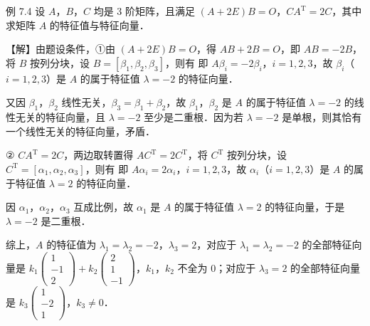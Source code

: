 \begin{fcard}{例 7.4}
设 $A$，$B$，$C$ 均是 3 阶矩阵，且满足 $(A+2E)B=O$，$CA^{\mathrm{T}}=2C$，其中
求矩阵 $A$ 的特征值与特征向量．

【解】由题设条件，①由 $(A+2E)B=O$，得 $AB+2B=O$，即 $AB=-2B$，将 $B$ 按列分块，设 $B=[\beta_1,\beta_2,\beta_3]$，则有
即 $A\beta_i=-2\beta_i$，$i=1,2,3$，故 $\beta_i$（$i=1,2,3$）是 $A$ 的属于特征值 $\lambda=-2$ 的特征向量．


又因 $\beta_1$，$\beta_2$ 线性无关，$\beta_3=\beta_1+\beta_2$，故 $\beta_1$，$\beta_2$ 是 $A$ 的属于特征值 $\lambda=-2$ 的线性无关的特征向量，且 $\lambda=-2$ 至少是二重根．因为若 $\lambda=-2$ 是单根，则其恰有一个线性无关的特征向量，矛盾．

② $CA^{\mathrm{T}}=2C$，两边取转置得 $AC^{\mathrm{T}}=2C^{\mathrm{T}}$，将 $C^{\mathrm{T}}$ 按列分块，设 $C^{\mathrm{T}}=[\alpha_1,\alpha_2,\alpha_3]$，则有
即 $A\alpha_i=2\alpha_i$，$i=1,2,3$，故 $\alpha_i$（$i=1,2,3$）是 $A$ 的属于特征值 $\lambda=2$ 的特征向量．

因 $\alpha_1$，$\alpha_2$，$\alpha_3$ 互成比例，故 $\alpha_1$ 是 $A$ 的属于特征值 $\lambda=2$ 的特征向量，于是 $\lambda=-2$ 是二重根．

综上，$A$ 的特征值为 $\lambda_1=\lambda_2=-2$，$\lambda_3=2$，对应于 $\lambda_1=\lambda_2=-2$ 的全部特征向量是 $k_1\begin{pmatrix}1\\-1\\2\end{pmatrix}+k_2\begin{pmatrix}2\\1\\-1\end{pmatrix}$，$k_1$，$k_2$ 不全为 0；对应于 $\lambda_3=2$ 的全部特征向量是 $k_3\begin{pmatrix}1\\-2\\1\end{pmatrix}$，$k_3\ne0$．
\end{fcard}

